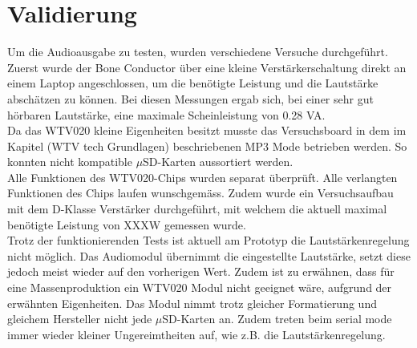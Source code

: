 \section{Validierung}
Um die Audioausgabe zu testen, wurden verschiedene Versuche durchgeführt. Zuerst wurde der Bone Conductor über eine kleine Verstärkerschaltung direkt an einem Laptop angeschlossen, um die benötigte Leistung und die Lautstärke abschätzen zu können. Bei diesen Messungen ergab sich, bei einer sehr gut hörbaren Lautstärke, eine maximale Scheinleistung von 0.28 VA.\\
Da das WTV020 kleine Eigenheiten besitzt musste das Versuchsboard in dem im Kapitel (WTV tech Grundlagen) beschriebenen MP3 Mode betrieben werden. So konnten nicht kompatible $\mu$SD-Karten aussortiert werden. \\
Alle Funktionen des WTV020-Chips wurden separat überprüft. Alle verlangten Funktionen des Chips laufen wunschgemäss. Zudem wurde ein Versuchsaufbau mit dem D-Klasse Verstärker durchgeführt, mit welchem die aktuell maximal benötigte Leistung von XXXW gemessen wurde. \\
Trotz der funktionierenden Tests ist aktuell am Prototyp die Lautstärkenregelung nicht möglich. Das Audiomodul übernimmt die eingestellte Lautstärke, setzt diese jedoch meist wieder auf den vorherigen Wert. Zudem ist zu erwähnen, dass für eine Massenproduktion ein WTV020 Modul nicht geeignet wäre, aufgrund der erwähnten Eigenheiten. Das Modul nimmt trotz gleicher Formatierung und gleichem Hersteller nicht jede $\mu$SD-Karten an. Zudem treten beim serial mode immer wieder kleiner Ungereimtheiten auf, wie z.B. die Lautstärkenregelung. 
